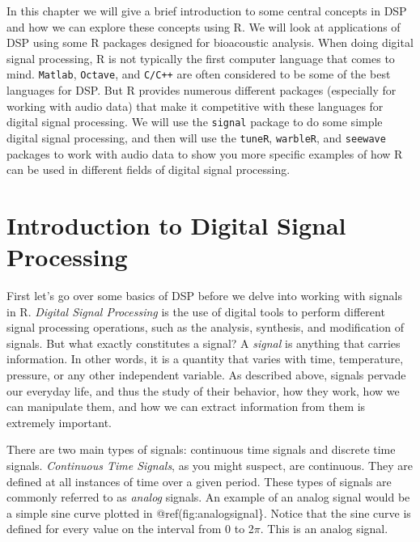 \documentclass[]{krantz}
\begin{document}
In this chapter we will give a brief introduction to some central concepts in DSP and how we can explore these concepts using R. We will look at applications of DSP using some R packages designed for bioacoustic analysis. When doing digital signal processing, R is not typically the first computer language that comes to mind. \texttt{Matlab}, \texttt{Octave}, and \texttt{C/C++} are often considered to be some of the best languages for DSP. But R provides numerous different packages (especially for working with audio data) that make it competitive with these languages for digital signal processing. We will use the \texttt{signal} package to do some simple digital signal processing, and then will use the \texttt{tuneR}, \texttt{warbleR}, and \texttt{seewave} packages to work with audio data to show you more specific examples of how R can be used in different fields of digital signal processing.

\hypertarget{introduction-to-digital-signal-processing}{%
\section{Introduction to Digital Signal Processing}\label{introduction-to-digital-signal-processing}}

First let's go over some basics of DSP before we delve into working with signals in R. \emph{Digital Signal Processing} is the use of digital tools to perform different signal processing operations, such as the analysis, synthesis, and modification of signals. But what exactly constitutes a signal? A \emph{signal} is anything that carries information. In other words, it is a quantity that varies with time, temperature, pressure, or any other independent variable. As described above, signals pervade our everyday life, and thus the study of their behavior, how they work, how we can manipulate them, and how we can extract information from them is extremely important.

There are two main types of signals: continuous time signals and discrete time signals. \emph{Continuous Time Signals}, as you might suspect, are continuous. They are defined at all instances of time over a given period. These types of signals are commonly referred to as \emph{analog} signals. An example of an analog signal would be a simple sine curve plotted in @ref(fig:analogsignal\}. Notice that the sine curve is defined for every value on the interval from 0 to 2\(\pi\). This is an analog signal.
\end{document}
